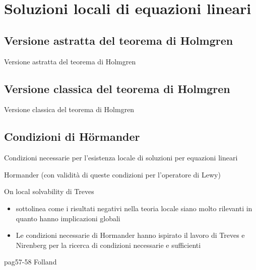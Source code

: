 \chapter{Soluzioni locali di equazioni lineari}

\section{Versione astratta del teorema di Holmgren}
Versione astratta del teorema di Holmgren
\section{Versione classica del teorema di Holmgren}
Versione classica del teorema di Holmgren
\section{Condizioni di Hörmander}\label{Hormander}
Condizioni necessarie per l'esistenza locale di soluzioni per equazioni lineari

Hormander (con validità di queste condizioni per l'operatore di Lewy)

On local solvability di Treves
\begin{itemize}
\item
sottolinea come i risultati negativi nella teoria locale siano molto rilevanti 
in quanto hanno implicazioni globali
\item
Le condizioni necessarie di Hormander hanno ispirato il lavoro di Treves e Nirenberg per la ricerca 
di condizioni necessarie e sufficienti
\end{itemize}

pag57-58 Folland
